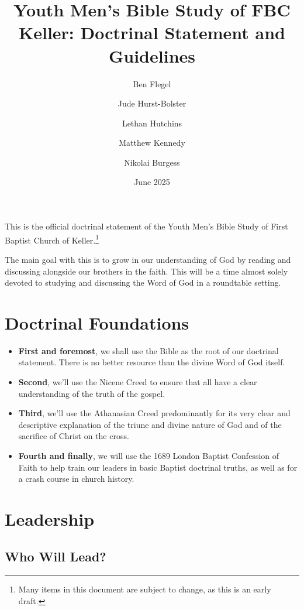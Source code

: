 \documentclass[12pt]{article}
\title{Youth Men's Bible Study of FBC Keller: Doctrinal Statement and Guidelines}
\author{Ben Flegel \and Jude Hurst-Bolster \and Lethan Hutchins \and Matthew Kennedy \and Nikolai Burgess }
\date{June 2025}
\begin{document}
\maketitle{}

  This is the official doctrinal statement of the Youth Men's Bible Study of
First Baptist Church of Keller.\footnote{Many items in this document are subject
to change, as this is an early draft.}

  The main goal with this is to grow in our understanding of God by reading and
discussing alongside our brothers in the faith. This will be a time almost
solely devoted to studying and discussing the Word of God in a roundtable
setting.

\section{Doctrinal Foundations}

\begin{itemize}

	\item \textbf{First and foremost}, we shall use the Bible as the root of our
	doctrinal statement. There is no better resource than the divine Word of
	God itself.

	\item \textbf{Second}, we'll use the Nicene Creed to ensure that all have a clear
	understanding of the truth of the gospel.

	\item \textbf{Third}, we'll use the Athanasian Creed predominantly for
	its very clear and descriptive explanation of the triune and divine
	nature of God and of the sacrifice of Christ on the cross.

	\item \textbf{Fourth and finally}, we will use the 1689 London Baptist
	Confession of Faith to help train our leaders in basic Baptist doctrinal
	truths, as well as for a crash course in church history.

\end{itemize}

\section{Leadership}

\subsection{Who Will Lead?}
\end{document}
